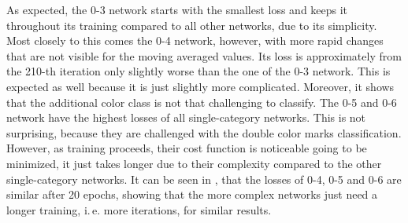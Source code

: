 As expected, the 0-3 network starts with the smallest loss and keeps it throughout its training compared to all other networks, due to its simplicity.
Most closely to this comes the 0-4 network, however, with more rapid changes that are not visible for the moving averaged values.
Its loss is approximately from the 210-th iteration only slightly worse than the one of the 0-3 network.
This is expected as well because it is just slightly more complicated.
Moreover, it shows that the additional color class is not that challenging to classify.
The 0-5 and 0-6 network have the highest losses of all single-category networks.
This is not surprising, because they are challenged with the double color marks classification.
However, as training proceeds, their cost function is noticeable going to be minimized, it just takes longer due to their complexity compared to the other single-category networks.
It can be seen in , that the losses of 0-4, 0-5 and 0-6 are similar after 20 epochs, showing that the more complex networks just need a longer training, i.\,e. more iterations, for similar results.

